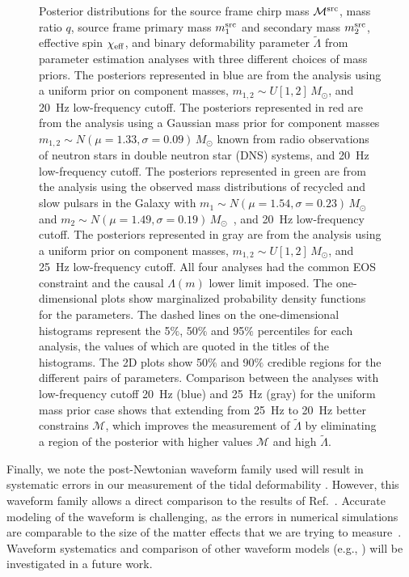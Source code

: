 \begin{figure}
\begin{adjustwidth}{-1.5cm}{-0.8cm}
  \caption{\footnotesize Posterior distributions for the source frame chirp mass $\mathcal{M}^{\rm src}$, mass ratio $q$, source frame primary mass $m_1^{\rm src}$ and secondary mass $m_2^{\rm src}$, effective spin $\chi_{\rm eff}$, and binary deformability parameter $\tilde{\Lambda}$ from parameter estimation analyses with three different choices of mass priors. The posteriors represented in blue are from the analysis using a uniform prior on component masses, $m_{1,2} \sim U[1,2]\, M_\odot$, and 20~Hz low-frequency cutoff. The posteriors represented in red are from the analysis using a Gaussian mass prior for component masses $m_{1,2} \sim N(\mu = 1.33, \sigma = 0.09)\, M_\odot$ known from radio observations of neutron stars in double neutron star (DNS) systems, and 20~Hz low-frequency cutoff. The posteriors represented in green are from the analysis using the observed mass distributions of recycled and slow pulsars in the Galaxy with $m_1 \sim N(\mu = 1.54, \sigma = 0.23)\, M_\odot$ and $m_2 \sim N(\mu = 1.49, \sigma = 0.19)\, M_\odot$~\cite{Ozel:2016oaf}, and 20~Hz low-frequency cutoff. The posteriors represented in gray are from the analysis using a uniform prior on component masses, $m_{1,2} \sim U[1,2]\, M_\odot$, and 25~Hz low-frequency cutoff. All four analyses had the common EOS constraint and the causal $\Lambda(m)$ lower limit imposed. The one-dimensional plots show marginalized probability density functions for the parameters. The dashed lines on the one-dimensional histograms represent the 5$\%$, 50$\%$ and 95$\%$ percentiles for each analysis, the values of which are quoted in the titles of the histograms. The 2D plots show 50$\%$ and 90$\%$ credible regions for the different pairs of parameters. Comparison between the analyses with low-frequency cutoff 20~Hz (blue) and 25~Hz (gray) for the uniform mass prior case shows that extending from 25~Hz to 20~Hz better constrains $\mathcal{M}$, which improves the measurement of $\tilde\Lambda$ by eliminating a region of the posterior with higher values $\mathcal{M}$ and high $\tilde\Lambda$.
  \label{fig:posterior_overlap}}
\end{adjustwidth}
\end{figure}

Finally, we note the post-Newtonian waveform family used will result in systematic errors in our measurement of the tidal deformability \cite{Wade:2014vqa,Lackey:2014fwa}. However, this waveform family allows a direct comparison to the results of Ref.~\cite{TheLIGOScientific:2017qsa}. Accurate modeling of the waveform is challenging, as the errors in numerical simulations are comparable to the size of the matter effects that we are trying to measure~\cite{Barkett:2015wia}. Waveform systematics and comparison of other waveform models (e.g., \cite{Bernuzzi:2014owa}) will be investigated in a future work.

